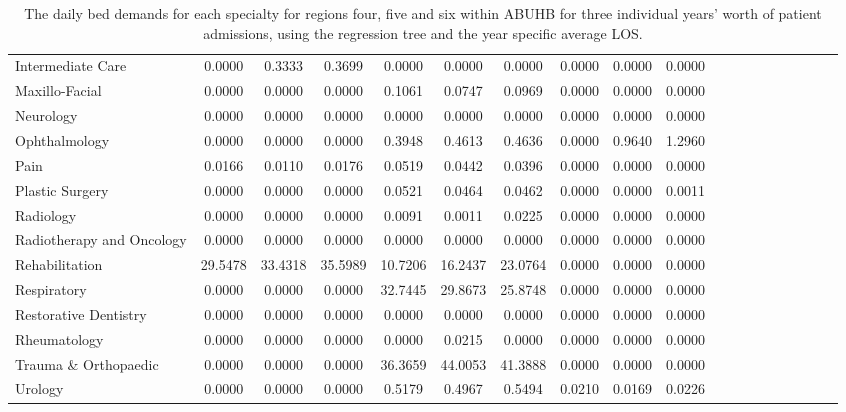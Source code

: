 \documentclass[thesis.tex]{subfiles}
\begin{document}
\begin{landscape}
\begin{table}[h!]
{\begin{tabular}{lcccccccccccccccccc}
Intermediate Care	&0.0000&	0.3333&	0.3699&	0.0000&	0.0000&	0.0000&	0.0000&	0.0000&	0.0000\\
Maxillo-Facial&	0.0000	&0.0000	&0.0000&	0.1061	&0.0747&	0.0969&	0.0000	&0.0000&	0.0000\\
Neurology&	0.0000&	0.0000&	0.0000&	0.0000&	0.0000&	0.0000&	0.0000&	0.0000&	0.0000\\
Ophthalmology&	0.0000&	0.0000&	0.0000&	0.3948&	0.4613&	0.4636&	0.0000&	0.9640&	1.2960\\
Pain&	0.0166&	0.0110&	0.0176&	0.0519&	0.0442&	0.0396&	0.0000&	0.0000&	0.0000\\
Plastic Surgery	&0.0000&	0.0000&	0.0000&	0.0521&	0.0464&	0.0462&	0.0000&	0.0000&	0.0011\\
Radiology&	0.0000&	0.0000&	0.0000&	0.0091&	0.0011&	0.0225&	0.0000&	0.0000&	0.0000\\
Radiotherapy and Oncology&	0.0000&	0.0000&	0.0000&	0.0000&	0.0000&	0.0000&	0.0000&	0.0000&	0.0000\\
Rehabilitation&	29.5478&	33.4318&	35.5989&	10.7206&	16.2437&	23.0764&	0.0000&	0.0000&	0.0000\\
Respiratory&	0.0000&	0.0000&	0.0000&	32.7445&	29.8673&	25.8748&	0.0000&	0.0000&	0.0000\\
Restorative Dentistry	&0.0000&	0.0000&	0.0000&	0.0000&	0.0000&	0.0000&	0.0000&	0.0000&	0.0000\\
Rheumatology&	0.0000&	0.0000&	0.0000&	0.0000&	0.0215&	0.0000&	0.0000&	0.0000&	0.0000\\
Trauma \& Orthopaedic&	0.0000&	0.0000&	0.0000&	36.3659&	44.0053&	41.3888&	0.0000&	0.0000&	0.0000\\
Urology&	0.0000&	0.0000&	0.0000&	0.5179&	0.4967&	0.5494&	0.0210&	0.0169&	0.0226\\


\bottomrule


\end{tabular}  } 
\caption{The daily bed demands for each specialty for regions four, five and six within ABUHB for three individual years’ worth of patient admissions, using the regression tree and the year specific average LOS.}
    \label{apptab:LinkedDemands3b}
\end{table}



\end{landscape}
\end{document}
